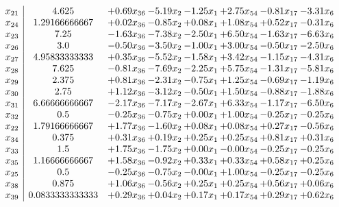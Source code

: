\documentclass[8pt]{article}
\begin{document}
\[\begin{array}{c| c c@{\hskip 2pt} c@{\hskip 2pt} c@{\hskip 2pt} c@{\hskip 2pt} c@{\hskip 2pt} c@{\hskip 2pt} }
 x_{21}   &  4.625 & +  0.69 x_{36} & -5.19 x_{2} & -1.25 x_{1} & +  2.75 x_{54} & -0.81 x_{17} & -3.31 x_{6}\\
 x_{24}   &  1.29166666667 & +  0.02 x_{36} & -0.85 x_{2} & +  0.08 x_{1} & +  1.08 x_{54} & +  0.52 x_{17} & -0.31 x_{6}\\
 x_{23}   &  7.25 & -1.63 x_{36} & -7.38 x_{2} & -2.50 x_{1} & +  6.50 x_{54} & -1.63 x_{17} & -6.63 x_{6}\\
 x_{26}   &  3.0 & -0.50 x_{36} & -3.50 x_{2} & -1.00 x_{1} & +  3.00 x_{54} & -0.50 x_{17} & -2.50 x_{6}\\
 x_{27}   &  4.95833333333 & +  0.35 x_{36} & -5.52 x_{2} & -1.58 x_{1} & +  3.42 x_{54} & -1.15 x_{17} & -4.31 x_{6}\\
 x_{28}   &  7.625 & -0.81 x_{36} & -7.69 x_{2} & -2.25 x_{1} & +  5.75 x_{54} & -1.31 x_{17} & -5.81 x_{6}\\
 x_{29}   &  2.375 & +  0.81 x_{36} & -2.31 x_{2} & -0.75 x_{1} & +  1.25 x_{54} & -0.69 x_{17} & -1.19 x_{6}\\
 x_{30}   &  2.75 & +  1.12 x_{36} & -3.12 x_{2} & -0.50 x_{1} & +  1.50 x_{54} & -0.88 x_{17} & -1.88 x_{6}\\
 x_{31}   &  6.66666666667 & -2.17 x_{36} & -7.17 x_{2} & -2.67 x_{1} & +  6.33 x_{54} & -1.17 x_{17} & -6.50 x_{6}\\
 x_{32}   &  0.5 & -0.25 x_{36} & -0.75 x_{2} & +  0.00 x_{1} & +  1.00 x_{54} & -0.25 x_{17} & -0.25 x_{6}\\
 x_{22}   &  1.79166666667 & +  1.77 x_{36} & -1.60 x_{2} & +  0.08 x_{1} & +  0.08 x_{54} & +  0.27 x_{17} & -0.56 x_{6}\\
 x_{34}   &  0.375 & +  0.31 x_{36} & +  0.19 x_{2} & +  0.25 x_{1} & +  0.25 x_{54} & +  0.81 x_{17} & +  0.31 x_{6}\\
 x_{33}   &  1.5 & +  1.75 x_{36} & -1.75 x_{2} & +  0.00 x_{1} & -0.00 x_{54} & -0.25 x_{17} & -0.25 x_{6}\\
 x_{35}   &  1.16666666667 & +  1.58 x_{36} & -0.92 x_{2} & +  0.33 x_{1} & +  0.33 x_{54} & +  0.58 x_{17} & +  0.25 x_{6}\\
 x_{25}   &  0.5 & -0.25 x_{36} & -0.75 x_{2} & -0.00 x_{1} & +  1.00 x_{54} & -0.25 x_{17} & -0.25 x_{6}\\
 x_{38}   &  0.875 & +  1.06 x_{36} & -0.56 x_{2} & +  0.25 x_{1} & +  0.25 x_{54} & +  0.56 x_{17} & +  0.06 x_{6}\\
 x_{39}   &  0.0833333333333 & +  0.29 x_{36} & +  0.04 x_{2} & +  0.17 x_{1} & +  0.17 x_{54} & +  0.29 x_{17} & +  0.62 x_{6}\\

\end{array}\]
\end{document}
